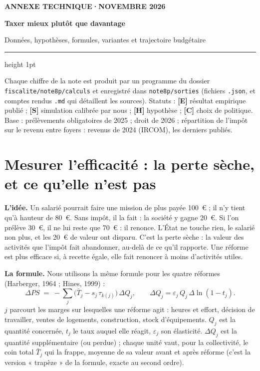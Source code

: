 \documentclass[10pt,a4paper]{article}
\begin{document}
{\footnotesize\color{brique}\bfseries ANNEXE TECHNIQUE\quad·\quad NOVEMBRE 2026\par}
\vspace{4pt}
{\fontsize{18}{22}\selectfont\bfseries\color{bleu}Taxer mieux plutôt que davantage\par}
\vspace{3pt}
{\large Données, hypothèses, formules, variantes et trajectoire budgétaire\par}
\vspace{5pt}
{\color{bleu}\hrule height 1pt}
\vspace{4pt}

{\small Chaque chiffre de la note est produit par un programme du dossier \texttt{fiscalite/note8p/calculs} et
enregistré dans \texttt{note8p/sorties} (fichiers \texttt{.json}, et comptes rendus \texttt{.md} qui détaillent les
sources). Statuts : \textbf{[E]} résultat empirique publié ; \textbf{[S]} simulation calibrée par nous ; \textbf{[H]}
hypothèse ; \textbf{[C]} choix de politique. Base : prélèvements obligatoires de 2025 ; droit de 2026 ; répartition de
l'impôt sur le revenu entre foyers : revenus de 2024 (IRCOM), les derniers publiés.\par}

{\setcounter{tocdepth}{1}\small\tableofcontents}

\section{Mesurer l'efficacité : la perte sèche, et ce qu'elle n'est pas}\label{ann:methode}

\textbf{L'idée.} Un salarié pourrait faire une mission de plus payée 100~€ ; il n'y tient qu'à hauteur de 80~€. Sans
impôt, il la fait : la société y gagne 20~€. Si l'on prélève 30~€, il ne lui reste que 70~€ : il renonce. L'État ne
touche rien, le salarié non plus, et les 20~€ de valeur ont disparu. C'est la perte sèche : la valeur des activités
que l'impôt fait abandonner, au-delà de ce qu'il rapporte. Une réforme est plus efficace si, à recette égale, elle fait
renoncer à moins d'activités utiles.

\textbf{La formule.} Nous utilisons la même formule pour les quatre réformes (Harberger, 1964 ; Hines, 1999) :
\[
\Delta PS \;=\; -\sum_j \big(\bar T_j - s_j\,\tau_{k(j)}\big)\,\Delta Q_j ,\qquad
\Delta Q_j = \varepsilon_j\,Q_j\,\Delta\ln(1-t_j).
\]
$j$ parcourt les marges sur lesquelles une réforme agit : heures et effort, décision de travailler, ventes de
logements, construction, stock d'équipements. $Q_j$ est la quantité concernée, $t_j$ le taux auquel elle réagit,
$\varepsilon_j$ son élasticité. $\Delta Q_j$ est la quantité supplémentaire (ou perdue) ; chaque unité vaut, pour la
collectivité, le coin total $\bar T_j$ qui la frappe, moyenne de sa valeur avant et après réforme (c'est la version
« trapèze » de la formule, exacte au second ordre).
\end{document}
